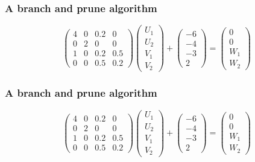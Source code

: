 \frame
{
\frametitle{A branch and prune algorithm}
\[\left(\begin{array}{cccc}
4&0&0.2&0\\
0&2&0&0\\
1&0&0.2&0.5\\
0&0&0.5&0.2
 \end{array}\right) \left(\begin{array}{c}
 U_1\\
 U_2\\
 V_1\\
 V_2
 \end{array}\right) + \left(\begin{array}{c}
 -6\\
 -4\\
 -3\\
 2
 \end{array}\right) =  \left(\begin{array}{c}
 0\\
 0\\
 W_1\\
 W_2
 \end{array}\right) 
 \]
\begin{figure}[h]
\centerline{
 \scalebox{0.5}{
    
 }
}
\end{figure}

}
\frame
{
\frametitle{A branch and prune algorithm}
\[\left(\begin{array}{cccc}
4&0&0.2&0\\
0&2&0&0\\
1&0&0.2&0.5\\
0&0&0.5&0.2
 \end{array}\right) \left(\begin{array}{c}
 U_1\\
 U_2\\
 V_1\\
 V_2
 \end{array}\right) + \left(\begin{array}{c}
 -6\\
 -4\\
 -3\\
 2
 \end{array}\right) =  \left(\begin{array}{c}
 0\\
 0\\
 W_1\\
 W_2
 \end{array}\right) 
 \]
\begin{figure}[h]
\centerline{
 \scalebox{0.5}{
    
 }
}
\end{figure}

}
